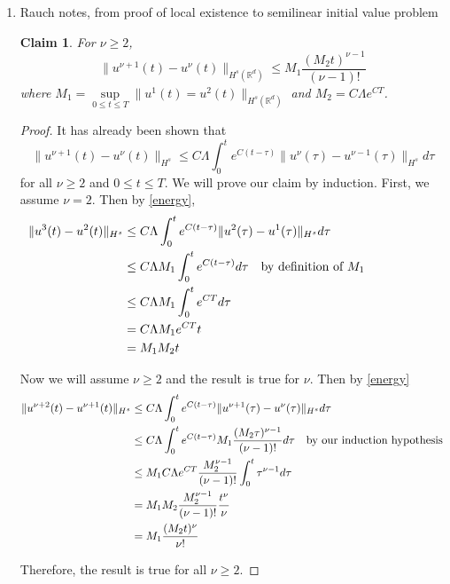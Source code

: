 \documentclass[a4paper]{article}
\newtheorem*{claim}{Claim}
\newcommand{\R}{\mathbb{R}}
\begin{document}
\begin{enumerate}
  \item Rauch notes, from proof of local existence to semilinear initial value problem
    \begin{claim} For $\nu \geq 2$,
      \[ \|u^{\nu + 1} (t) - u^\nu(t) \|_{H^s(\R^d)} \leq M_1 \frac{(M_2 t)^{\nu - 1}}{(\nu - 1)!} \]
      where $M_1 = \sup\limits_{0 \leq t \leq T} \|u^1(t) = u^2(t)\|_{H^s(\R^d)}$ and $M_2 = C \Lambda e^{CT}$.
  \end{claim}
  \begin{proof}
    It has already been shown that
    \begin{equation} \label{energy}
      \| u^{\nu + 1}(t) - u^\nu(t) \|_{H^s} \leq C \Lambda \int_{0}^{t} e^{C (t-\tau)} \|u^\nu(\tau) - u^{\nu-1}(\tau) \|_{H^s} d\tau 
    \end{equation}
    for all $\nu \geq 2$ and $0 \leq t \leq T$.
    We will prove our claim by induction. First, we assume $\nu = 2$. Then by \eqref{energy},
    \begin{align*}
      \| u^3(t) - u^2(t) \|_{H^s} &\leq C \Lambda \int_{0}^{t} e^{C(t-\tau)} \|u^2(\tau) - u^1(\tau) \|_{H^s} d\tau \\
      &\leq C \Lambda M_1 \int_{0}^{t} e^{C(t-\tau)} d\tau \quad \parbox{5cm}{by definition of $M_1$} \\
      &\leq C \Lambda M_1 \int_{0}^{t} e^{CT} d\tau \\
      &= C \Lambda M_1 e^{CT} t \\
      &= M_1 M_2 t
    \end{align*}

    Now we will assume $\nu \geq 2$ and the result is true for $\nu$. Then by \eqref{energy}
    \begin{align*}
      \|u^{\nu+2}(t) - u^{\nu+1}(t)\|_{H^s} &\leq C \Lambda \int_{0}^{t} e^{C(t-\tau)} \|u^{\nu+1}(\tau) - u^\nu(\tau) \|_{H^s} d\tau \\
      &\leq C \Lambda \int_{0}^{t} e^{C(t-\tau)} M_1 \frac{(M_2 \tau)^{\nu-1}}{(\nu-1)!} d\tau \quad \parbox{5cm}{by our induction hypothesis} \\
      &\leq M_1 C \Lambda e^{CT} \frac{M_2^{\nu-1}}{(\nu-1)!} \int_{0}^{t} \tau^{\nu-1} d\tau \\
      &= M_1 M_2 \frac{M_2^{\nu-1}}{(\nu-1)!} \frac{t^\nu}{\nu} \\
      &= M_1 \frac{(M_2 t)^{\nu}}{\nu!}
    \end{align*}

    Therefore, the result is true for all $\nu \geq 2$.
  \end{proof}


\end{enumerate}
\end{document}
